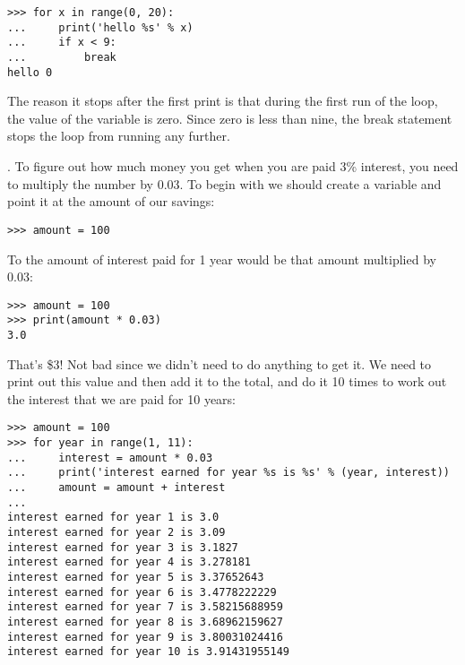 \begin{listing}
\begin{verbatim}
>>> for x in range(0, 20):
...     print('hello %s' % x)
...     if x < 9:
...         break
hello 0
\end{verbatim}
\end{listing}

\noindent
The reason it stops after the first print is that during the first run of the loop, the value of the variable  is zero.  Since zero is less than nine, the break statement stops the loop from running any further.

. To figure out how much money you get when you are paid 3\% interest, you need to multiply the number by 0.03.  To begin with we should create a variable and point it at the amount of our savings:

\begin{listing}
\begin{verbatim}
>>> amount = 100
\end{verbatim}
\end{listing}

To the amount of interest paid for 1 year would be that amount multiplied by 0.03:

\begin{listing}
\begin{verbatim}
>>> amount = 100
>>> print(amount * 0.03)
3.0
\end{verbatim}
\end{listing}

That's \$3!  Not bad since we didn't need to do anything to get it.  We need to print out this value and then add it to the total, and do it 10 times to work out the interest that we are paid for 10 years:

\begin{listing}
\begin{verbatim}
>>> amount = 100
>>> for year in range(1, 11):
...     interest = amount * 0.03
...     print('interest earned for year %s is %s' % (year, interest))
...     amount = amount + interest
... 
interest earned for year 1 is 3.0
interest earned for year 2 is 3.09
interest earned for year 3 is 3.1827
interest earned for year 4 is 3.278181
interest earned for year 5 is 3.37652643
interest earned for year 6 is 3.4778222229
interest earned for year 7 is 3.58215688959
interest earned for year 8 is 3.68962159627
interest earned for year 9 is 3.80031024416
interest earned for year 10 is 3.91431955149
\end{verbatim}
\end{listing}

